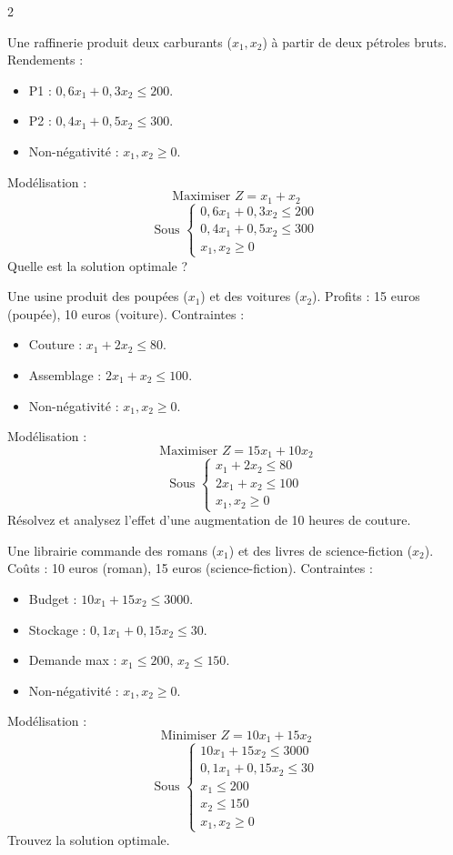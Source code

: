 \begin{multicols}{2}
\begin{exercice}
	Une raffinerie produit deux carburants (\(x_1, x_2\)) à partir de deux pétroles bruts. Rendements :
	\begin{itemize}
		\item P1 : \(0,6x_1 + 0,3x_2 \leq 200\).
		\item P2 : \(0,4x_1 + 0,5x_2 \leq 300\).
		\item Non-négativité : \(x_1, x_2 \geq 0\).
	\end{itemize}
	Modélisation :
	\[
	\text{Maximiser } Z = x_1 + x_2
	\]
	\[
	\text{Sous } \begin{cases}
	0,6x_1 + 0,3x_2 \leq 200 \\
	0,4x_1 + 0,5x_2 \leq 300 \\
	x_1, x_2 \geq 0
	\end{cases}
	\]
	Quelle est la solution optimale ?
\end{exercice}

\begin{exercice}
	Une usine produit des poupées (\(x_1\)) et des voitures (\(x_2\)). Profits : 15 euros (poupée), 10 euros (voiture). Contraintes :
	\begin{itemize}
		\item Couture : \(x_1 + 2x_2 \leq 80\).
		\item Assemblage : \(2x_1 + x_2 \leq 100\).
		\item Non-négativité : \(x_1, x_2 \geq 0\).
	\end{itemize}
	Modélisation :
	\[
	\text{Maximiser } Z = 15x_1 + 10x_2
	\]
	\[
	\text{Sous } \begin{cases}
	x_1 + 2x_2 \leq 80 \\
	2x_1 + x_2 \leq 100 \\
	x_1, x_2 \geq 0
	\end{cases}
	\]
	Résolvez et analysez l'effet d'une augmentation de 10 heures de couture.
\end{exercice}

\begin{exercice}
	Une librairie commande des romans (\(x_1\)) et des livres de science-fiction (\(x_2\)). Coûts : 10 euros (roman), 15 euros (science-fiction). Contraintes :
	\begin{itemize}
		\item Budget : \(10x_1 + 15x_2 \leq 3000\).
		\item Stockage : \(0,1x_1 + 0,15x_2 \leq 30\).
		\item Demande max : \(x_1 \leq 200\), \(x_2 \leq 150\).
		\item Non-négativité : \(x_1, x_2 \geq 0\).
	\end{itemize}
	Modélisation :
	\[
	\text{Minimiser } Z = 10x_1 + 15x_2
	\]
	\[
	\text{Sous } \begin{cases}
	10x_1 + 15x_2 \leq 3000 \\
	0,1x_1 + 0,15x_2 \leq 30 \\
	x_1 \leq 200 \\
	x_2 \leq 150 \\
	x_1, x_2 \geq 0
	\end{cases}
	\]
	Trouvez la solution optimale.
\end{exercice}


\end{multicols}
